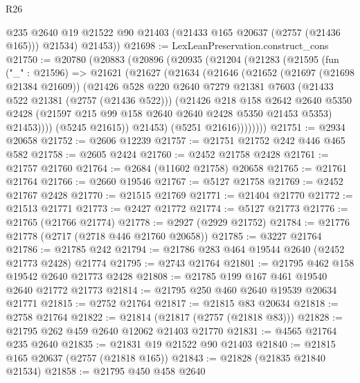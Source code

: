\begin{lexlean}{R26}
\begin{coremodule}
          @235
          @2640
          @19
          @21522
          @90
          @21403
          (@21433 @165 @20637 (@2757 (@21436 @165)))
          @21534)
        @21453))
@21698 := LexLeanPreservation.construct_cons
@21750 := @20780
    (@20883
      (@20896
        (@20935
          (@21204
            (@21283
              (@21595
                (fun ("_" : @21596) =>
                @21621
                  (@21627
                    (@21634
                      (@21646
                        (@21652
                          (@21697 (@21698 @21384 @21609))
                          (@21426
                            @528
                            @220
                            @2640
                            @7279
                            @21381
                            @7603
                            (@21433 @522 @21381 (@2757 (@21436 @522)))
                            (@21426
                              @218
                              @158
                              @2642
                              @2640
                              @5350
                              @2428
                              (@21597 @215 @99 @158 @2640 @2640 @2428 @5350 @21453 @5353)
                              @21453))))
                      (@5245 @21615))
                    @21453)
                  (@5251 @21616))))))))
@21751 := @2934 @20658
@21752 := @2606 @12239
@21757 := @21751 @21752 @242 @446 @465 @582
@21758 := @2605 @2424
@21760 := @2452 @21758 @2428
@21761 := @21757 @21760
@21764 := @2684 (@11602 @21758) @20658
@21765 := @21761 @21764
@21766 := @2660 @19546
@21767 := @5127 @21758
@21769 := @2452 @21767 @2428
@21770 := @21515 @21769
@21771 := @21404 @21770
@21772 := @21513 @21771
@21773 := @2427 @21772
@21774 := @5127 @21773
@21776 := @21765 (@21766 @21774)
@21778 := @2927 (@2929 @21752)
@21784 := @21776 @21778 (@2717 (@2718 @446 @21760 @20658))
@21785 := @3227 @21764
@21786 := @21785 @242
@21794 := @21786 @283 @464 @19544 @2640 (@2452 @21773 @2428) @21774
@21795 := @2743 @21764
@21801 := @21795 @462 @158 @19542 @2640 @21773 @2428
@21808 := @21785 @199 @167 @461 @19540 @2640 @21772 @21773
@21814 := @21795 @250 @460 @2640 @19539 @20634 @21771
@21815 := @2752 @21764
@21817 := @21815 @83 @20634
@21818 := @2758 @21764
@21822 := @21814 (@21817 (@2757 (@21818 @83)))
@21828 := @21795 @262 @459 @2640 @12062 @21403 @21770
@21831 := @4565 @21764 @235 @2640
@21835 := @21831 @19 @21522 @90 @21403
@21840 := @21815 @165 @20637 (@2757 (@21818 @165))
@21843 := @21828 (@21835 @21840 @21534)
@21858 := @21795
    @450
    @458
    @2640

\end{coremodule}
\end{lexlean}
